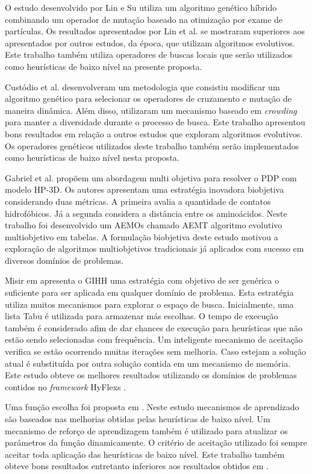 O estudo \cite{lin2011protein} desenvolvido por Lin e Su utiliza um algoritmo genético híbrido combinando um operador de mutação baseado na otimização por exame de partículas. Os resultados apresentados por Lin et al. se mostraram superiores aos apresentados por outros estudos, da época, que utilizam algoritmos evolutivos. Este trabalho também utiliza operadores de buscas locais que serão utilizados como heurísticas de baixo nível na presente proposta. 


Custódio et al. \cite{custodio2014multiple} desenvolveram um metodologia que consistiu modificar um algoritmo genético para selecionar os operadores de cruzamento e mutação de maneira dinâmica. Além disso, utilizaram um mecanismo baseado em \textit{crowding}  para manter a diversidade durante o processo de busca. Este trabalho apresentou bons resultados em relação a outros estudos que exploram algoritmos evolutivos. Os operadores genéticos utilizados deste trabalho também serão implementados como heurísticas de baixo nível nesta proposta.

Gabriel et al. propõem um abordagem multi objetiva \cite{gabriel2012algoritmos} para resolver o PDP com modelo HP-3D. Os autores apresentam uma estratégia inovadora biobjetiva considerando duas métricas. A primeira avalia a quantidade de contatos hidrofóbicos. Já a segunda considera a distância entre os aminoácidos. Neste trabalho foi desenvolvido um AEMOs chamado AEMT \cite{gabriel2012algoritmos} algoritmo evolutivo multiobjetivo em tabelas. A formulação biobjetiva deste estudo motivou a exploração de algoritmos multiobjetivos tradicionais já aplicados com sucesso em diversos domínios de problemas.  


Misir em \cite{misir2012intelligent} apresenta o GIHH uma estratégia com objetivo de ser genérica o suficiente para ser aplicada em qualquer domínio de problema. Esta estratégia utiliza muitos mecanismos para explorar o espaço de busca. Inicialmente, uma lista Tabu é utilizada para armazenar más escolhas. O tempo de execução também é considerado afim de dar chances de execução para heurísticas que não estão sendo selecionadas com frequência. Um inteligente mecanismo de aceitação verifica se estão ocorrendo muitas iterações sem melhoria. Caso estejam a solução atual é substituída por outra solução contida em um mecanismo de memória. Este estudo obteve os melhores resultados utilizando os domínios de problemas contidos no \textit{framework} HyFlexs \cite{ochoa2012hyflex}.

Uma função escolha foi proposta em \cite{drake2012improved}. Neste estudo mecanismos de aprendizado são baseados nas melhorias obtidas pelas heurísticas de baixo nível. Um mecanismo de reforço de aprendizagem também é utilizado para atualizar os parâmetros da função dinamicamente. O critério de aceitação utilizado foi sempre aceitar toda aplicação das heurísticas de baixo nível. Este trabalho também obteve bons resultados entretanto inferiores aos resultados obtidos em \cite{misir2012intelligent}.




